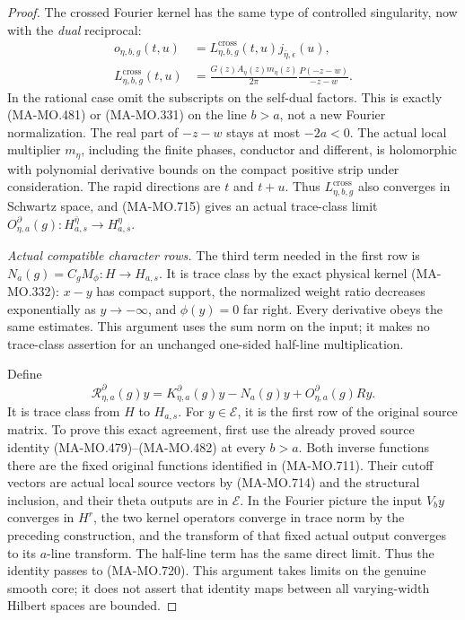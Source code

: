 \begin{proof}
The crossed Fourier kernel has the same type of
controlled singularity, now with the \emph{dual}
reciprocal:
\[
 \begin{aligned}
 o_{\eta,b,g}(t,u)
   &=L^{\mathrm{cross}}_{\eta,b,g}(t,u)
                                      j_{\bar\eta,\epsilon}(u),\\
 L^{\mathrm{cross}}_{\eta,b,g}(t,u)
   &=\frac{G(z)A_\eta(z)m_\eta(z)}{2\pi}
                              \frac{P(-z-w)}{-z-w}.
 \end{aligned}
 \tag{MA-MO.719}
\]
In the rational case omit the subscripts on the
self-dual factors. This is exactly (MA-MO.481)
or (MA-MO.331) on the line \(b>a\), not a
new Fourier normalization. The real part of
\(-z-w\) stays at most \(-2a<0\).
The actual local multiplier \(m_\eta\), including
the finite phases, conductor and different, is
holomorphic with polynomial derivative bounds
on the compact positive strip under consideration.
The rapid directions are \(t\) and \(t+u\).
Thus \(L^{\mathrm{cross}}_{\eta,b,g}\) also
converges in Schwartz space, and (MA-MO.715)
gives an actual trace-class limit
\(O_{\eta,a}^{\partial}(g):H_{a,s}^{\bar\eta}
\to H_{a,s}^{\eta}\).

\emph{Actual compatible character rows.}
The third term needed in the first row is
\(N_a(g)=C_gM_\phi:H\to H_{a,s}\).
It is trace class by the exact physical kernel
(MA-MO.332): \(x-y\) has compact support,
the normalized weight ratio decreases exponentially
as \(y\to-\infty\), and \(\phi(y)=0\) far right.
Every derivative obeys the same estimates.
This argument uses the sum norm on the input;
it makes no trace-class assertion for an unchanged
one-sided half-line multiplication.

Define
\[
 \mathscr R_{\eta,a}^{\partial}(g)y
       =K_{\eta,a}^{\partial}(g)y
                     -N_a(g)y+O_{\eta,a}^{\partial}(g)Ry .
 \tag{MA-MO.720}
\]
It is trace class from \(H\) to \(H_{a,s}\).
For \(y\in\mathcal E\), it is the first row of
the original source matrix. To prove this exact
agreement, first use the already proved source
identity (MA-MO.479)--(MA-MO.482) at every
\(b>a\). Both inverse functions there are the
fixed original functions identified in
(MA-MO.711). Their cutoff vectors are actual
local source vectors by (MA-MO.714) and the
structural inclusion, and their theta outputs
are in \(\mathcal E\). In the Fourier picture
the input \(V_by\) converges in \(H^r\), the
two kernel operators converge in trace norm by
the preceding construction, and the transform
of that fixed actual output converges to its
\(a\)-line transform. The half-line term has
the same direct limit. Thus the identity passes
to (MA-MO.720). This argument takes limits
on the genuine smooth core; it does not assert
that identity maps between all varying-width
Hilbert spaces are bounded.


\end{proof}
